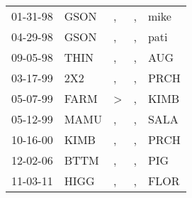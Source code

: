 \begin{supertabular}{lllll}
 01-31-98 &  GSON &             , &  , &  mike \\
 04-29-98 &  GSON &             , &  , &  pati \\
 09-05-98 &  THIN &             , &  , &   AUG \\
 03-17-99 &   2X2 &             , &  , &  PRCH \\
 05-07-99 &  FARM &  \textgreater &  , &  KIMB \\
 05-12-99 &  MAMU &             , &  , &  SALA \\
 10-16-00 &  KIMB &             , &  , &  PRCH \\
 12-02-06 &  BTTM &             , &  , &   PIG \\
 11-03-11 &  HIGG &             , &  , &  FLOR \\
\end{supertabular}
